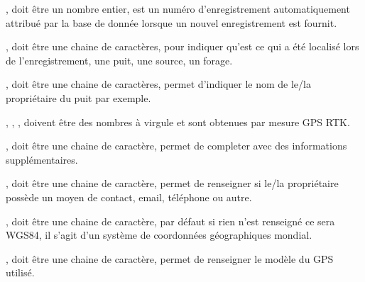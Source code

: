 \documentclass[letterpaper,10pt,french]{sphinxmanual}
\begin{document}
\begin{sphinxVerbatim}[commandchars=\\\{\}]
                                                                                                                                                                                                                                                                     
\end{sphinxVerbatim}

\sphinxAtStartPar
{}, doit être un nombre entier, est un numéro d’enregistrement automatiquement attribué par la base de donnée lorsque un nouvel enregistrement est fournit.

\sphinxAtStartPar
{}, doit être une chaine de caractères, pour indiquer qu’est ce qui a été localisé lors de l’enregistrement, une puit, une source, un forage.

\sphinxAtStartPar
{}, doit être une chaine de caractères, permet d’indiquer le nom de le/la propriétaire du puit par exemple.

\sphinxAtStartPar
{}, , , doivent être des nombres à virgule et sont obtenues par mesure GPS RTK.

\sphinxAtStartPar
{}, doit être une chaine de caractère, permet de completer avec des informations supplémentaires.

\sphinxAtStartPar
{}, doit être une chaine de caractère, permet de renseigner si le/la propriétaire possède un moyen de contact, email, téléphone ou autre.

\sphinxAtStartPar
{}, doit être une chaine de caractère, par défaut si rien n’est renseigné ce sera WGS84,  il s’agit d’un système de coordonnées géographiques mondial.

\sphinxAtStartPar
{}, doit être une chaine de caractère, permet de renseigner le modèle du GPS utilisé.
\end{document}
